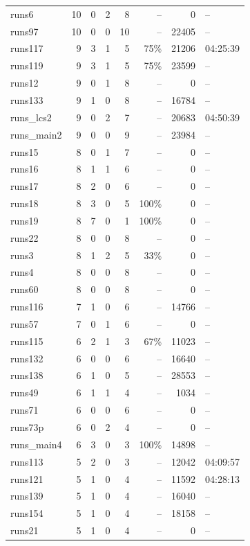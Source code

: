 \begin{longtable}{@{}lrrrrrrl@{}}
runs6 & 10 & 0 & 2 & 8 & -- & 0 & -- \\
runs97 & 10 & 0 & 0 & 10 & -- & 22405 & -- \\
runs117 & 9 & 3 & 1 & 5 & 75\% & 21206 & 04:25:39 \\
runs119 & 9 & 3 & 1 & 5 & 75\% & 23599 & -- \\
runs12 & 9 & 0 & 1 & 8 & -- & 0 & -- \\
runs133 & 9 & 1 & 0 & 8 & -- & 16784 & -- \\
runs\_lcs2 & 9 & 0 & 2 & 7 & -- & 20683 & 04:50:39 \\
runs\_main2 & 9 & 0 & 0 & 9 & -- & 23984 & -- \\
runs15 & 8 & 0 & 1 & 7 & -- & 0 & -- \\
runs16 & 8 & 1 & 1 & 6 & -- & 0 & -- \\
runs17 & 8 & 2 & 0 & 6 & -- & 0 & -- \\
runs18 & 8 & 3 & 0 & 5 & 100\% & 0 & -- \\
runs19 & 8 & 7 & 0 & 1 & 100\% & 0 & -- \\
runs22 & 8 & 0 & 0 & 8 & -- & 0 & -- \\
runs3 & 8 & 1 & 2 & 5 & 33\% & 0 & -- \\
runs4 & 8 & 0 & 0 & 8 & -- & 0 & -- \\
runs60 & 8 & 0 & 0 & 8 & -- & 0 & -- \\
runs116 & 7 & 1 & 0 & 6 & -- & 14766 & -- \\
runs57 & 7 & 0 & 1 & 6 & -- & 0 & -- \\
runs115 & 6 & 2 & 1 & 3 & 67\% & 11023 & -- \\
runs132 & 6 & 0 & 0 & 6 & -- & 16640 & -- \\
runs138 & 6 & 1 & 0 & 5 & -- & 28553 & -- \\
runs49 & 6 & 1 & 1 & 4 & -- & 1034 & -- \\
runs71 & 6 & 0 & 0 & 6 & -- & 0 & -- \\
runs73p & 6 & 0 & 2 & 4 & -- & 0 & -- \\
runs\_main4 & 6 & 3 & 0 & 3 & 100\% & 14898 & -- \\
runs113 & 5 & 2 & 0 & 3 & -- & 12042 & 04:09:57 \\
runs121 & 5 & 1 & 0 & 4 & -- & 11592 & 04:28:13 \\
runs139 & 5 & 1 & 0 & 4 & -- & 16040 & -- \\
runs154 & 5 & 1 & 0 & 4 & -- & 18158 & -- \\
runs21 & 5 & 1 & 0 & 4 & -- & 0 & -- \\

\end{longtable}
